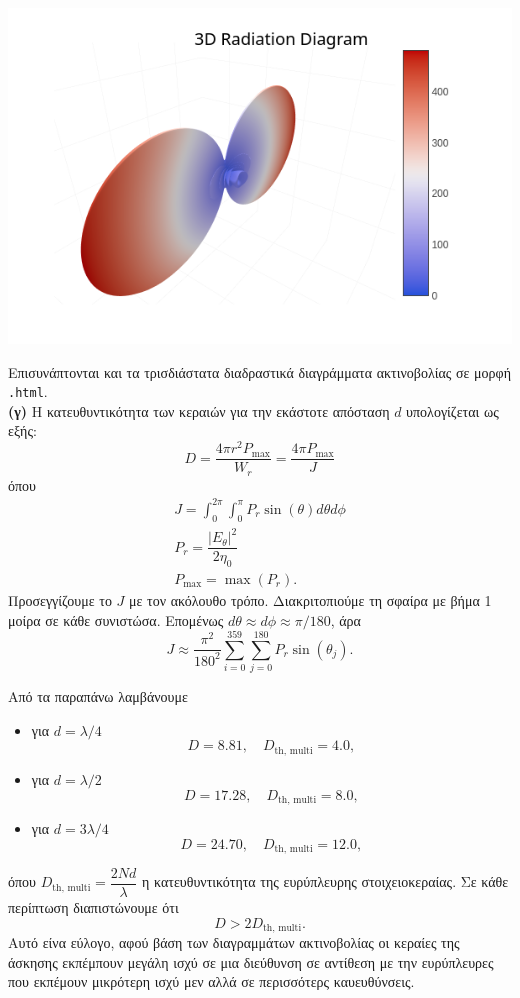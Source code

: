 \documentclass[12pt]{article}
\begin{document}
\begin{itemize}
\begin{center}
        \includegraphics*[scale=0.6]{075_3d.png}
    \end{center}
\end{itemize}
Επισυνάπτονται και τα τρισδιάστατα διαδραστικά διαγράμματα ακτινοβολίας σε μορφή \texttt{.html}.  \\

\textbf{(γ)} Η κατευθυντικότητα των κεραιών για την εκάστοτε απόσταση \(d \) υπολογίζεται ως εξής: 
\begin{equation*}
    D = \dfrac{4\pi r^2 P_{\max}}{W_r} = \dfrac{4\pi P_{\max}}{J}
\end{equation*}
όπου
\begin{gather}
    J = \int_{0}^{2\pi }\int_{0 }^{ \pi  }  P_r \sin(\theta) d\theta d\phi \\
    P_r = \dfrac{|E_\theta|^2 }{2\eta_0} \\ 
    P_{\max} = \max(P_r).
\end{gather}
Προσεγγίζουμε το \(J \) με τον ακόλουθο τρόπο. Διακριτοπιούμε τη σφαίρα με βήμα 1 μοίρα σε κάθε συνιστώσα. Επομένως \(d\theta \approx d\phi \approx \pi / 180\), άρα
\begin{equation}
    J \approx \dfrac{\pi^2}{180^2}\sum_{i = 0 }^{359} \sum_{j = 0 }^{180 } P_r \sin(\theta_j). 
\end{equation}

Από τα παραπάνω λαμβάνουμε
\begin{itemize}
    \item για \(d = \lambda/4\) 
    \[D = 8.81, \quad D_{\text{th, multi}} = 4.0,\]

    \item για \(d = \lambda/2\) 
    \[D = 17.28, \quad D_{\text{th, multi}} = 8.0,\]

    \item για \(d = 3\lambda/4\) 
    \[D = 24.70, \quad D_{\text{th, multi}} = 12.0,\] 
\end{itemize}
όπου \(D_{\text{th, multi}} = \dfrac{2Nd }{\lambda}\) η κατευθυντικότητα της ευρύπλευρης στοιχειοκεραίας. 
Σε κάθε περίπτωση διαπιστώνουμε ότι \[D > 2D_\text{th, multi}.\] Αυτό είνα εύλογο, αφού βάση των διαγραμμάτων ακτινοβολίας οι κεραίες της άσκησης εκπέμπουν μεγάλη ισχύ σε μια διεύθυνση σε αντίθεση με την ευρύπλευρες που εκπέμουν μικρότερη ισχύ μεν αλλά σε περισσότερς καυευθύνσεις. \\
\end{document}
